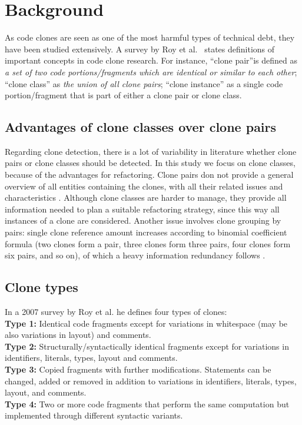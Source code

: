 \documentclass[a4paper]{article}
\begin{document}
\section{Background}\label{chap:background}
As code clones are seen as one of the most harmful types of technical debt, they have been studied extensively. A survey by Roy et al.~\cite{roy2007survey} states definitions of important concepts in code clone research. For instance, ``clone pair''is defined as \textit{a set of two code portions/fragments which are identical or similar to each other}; ``clone class'' as \textit{the union of all clone pairs}; ``clone instance'' as a single code portion/fragment that is part of either a clone pair or clone class.
\subsection{Advantages of clone classes over clone pairs}\label{chap:cloneclasses}
Regarding clone detection, there is a lot of variability in literature whether clone pairs or clone classes should be detected. In this study we focus on clone classes, because of the advantages for refactoring. Clone pairs don not provide a general overview of all entities containing the clones, with all their related issues and characteristics \cite{fontana2012duplicated}. Although clone classes are harder to manage, they provide all information needed to plan a suitable refactoring strategy, since this way all instances of a clone are considered. Another issue involves clone grouping by pairs: single clone reference amount increases according to binomial coefficient formula (two clones form a pair, three clones form three pairs, four clones form six pairs, and so on), of which a heavy information redundancy follows \cite{fontana2012duplicated}.

\subsection{Clone types}
In a 2007 survey by Roy et al. \cite{roy2007survey} he defines four types of clones:\\
\textbf{Type 1:} Identical code fragments except for variations in whitespace (may be also variations in layout) and comments.\\
\textbf{Type 2:} Structurally/syntactically identical fragments except for variations in identifiers, literals, types, layout and comments.\\
\textbf{Type 3:} Copied fragments with further modifications. Statements can be changed, added or removed in addition to variations in identifiers, literals, types, layout, and comments.\\
\textbf{Type 4:} Two or more code fragments that perform the same computation but implemented through different syntactic variants.
\end{document}
